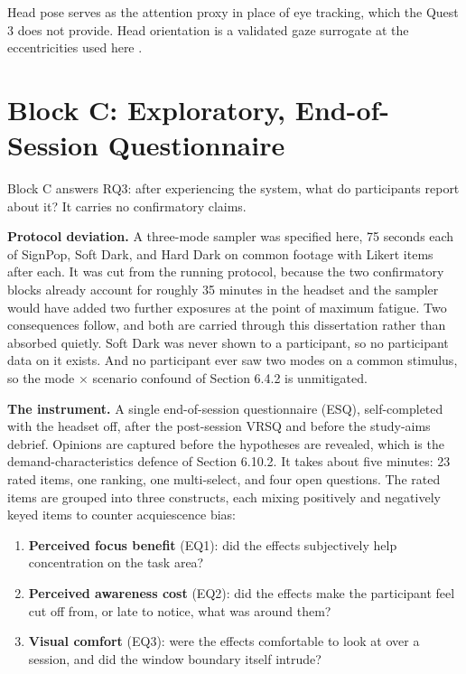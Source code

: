 Head pose serves as the attention proxy in place of eye tracking, which the Quest 3 does not provide.
Head orientation is a validated gaze surrogate at the eccentricities used here \citep{higgins2022,sitzmann2018}.

\section{Block C: Exploratory, End-of-Session Questionnaire}

Block C answers RQ3: after experiencing the system, what do participants report about it? It carries
no confirmatory claims.

\textbf{Protocol deviation.} A three-mode sampler was specified here, 75 seconds each of SignPop, Soft
Dark, and Hard Dark on common footage with Likert items after each. It was cut from the running
protocol, because the two confirmatory blocks already account for roughly 35 minutes in the headset
and the sampler would have added two further exposures at the point of maximum fatigue. Two
consequences follow, and both are carried through this dissertation rather than absorbed quietly.
Soft Dark was never shown to a participant, so no participant data on it exists. And no participant
ever saw two modes on a common stimulus, so the mode $\times$ scenario confound of Section 6.4.2 is
unmitigated.

\textbf{The instrument.} A single end-of-session questionnaire (ESQ), self-completed
with the headset off, after the post-session VRSQ and before the study-aims debrief. Opinions are
captured before the hypotheses are revealed, which is the demand-characteristics defence of
Section 6.10.2. It takes about five minutes: 23 rated items, one ranking, one multi-select, and four
open questions. The rated items are grouped into three constructs, each mixing positively and
negatively keyed items to counter acquiescence bias:

\begin{enumerate}
\item \textbf{Perceived focus benefit} (EQ1): did the effects subjectively help concentration on the
  task area?
\item \textbf{Perceived awareness cost} (EQ2): did the effects make the participant feel cut off
  from, or late to notice, what was around them?
\item \textbf{Visual comfort} (EQ3): were the effects comfortable to look at over a session, and did
  the window boundary itself intrude?
\end{enumerate}

